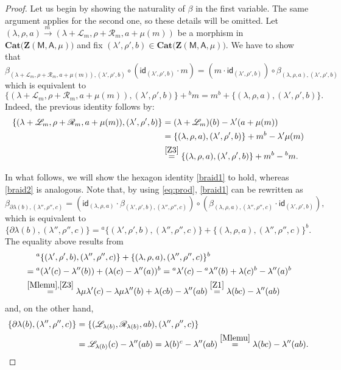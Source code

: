 \documentclass[12pt,reqno]{amsart}
\theoremstyle{plain}
\theoremstyle{definition}
\theoremstyle{remark}
\newcommand{\A}{\ensuremath{\mathsf{A}}}
\newcommand{\id}{\ensuremath{\mathsf{id}}}
\newcommand{\MM}{\ensuremath{\mathsf{M}}}
\newcommand{\ZC}{\ensuremath{\mathbf{Z}}}
\newcommand{\Cat}{\ensuremath{\mathbf{Cat}}}
\newcommand{\LL}{\ensuremath{\mathcal{L}}}
\newcommand{\RR}{\ensuremath{\mathcal{R}}}
\numberwithin{equation}{section}
\begin{document}
\begin{proof}
	Let us begin by showing the naturality of $\beta$ in the first variable. The same argument applies for the second one, so these details will be omitted.
	 Let $(\lambda,\rho,a)\xrightarrow{m\,}(\lambda+\LL_{m},\rho+\RR_{m},a+\mu(m))$ be a morphism in $\Cat\big(\ZC(\MM,\A,\mu)\big)$ and fix
	  $(\lambda',\rho',b)\in \Cat\big(\ZC(\MM,\A,\mu)\big)$. We have to show that 
	\[\beta_{(\lambda+\LL_{m},\rho+\RR_{m},a+\mu(m)),(\lambda',\rho',b)}\circ (\id_{(\lambda',\rho',b)}\cdot m)=(m\cdot  \id_{(\lambda',\rho',b)})\circ \beta_{(\lambda,\rho,a),(\lambda',\rho',b)}\]
	which is equivalent to 
	\[\{(\lambda+\LL_{m},\rho+\RR_{m},a+\mu(m)),(\lambda',\rho',b)\}+{}^{b}m=m^{b}+\{(\lambda,\rho,a),(\lambda',\rho',b)\}.\]
	Indeed, the previous identity follows by:
	\begin{align*}
		\{(\lambda+\LL_{m},\rho+\RR_{m},a+\mu(m)),(\lambda',\rho',b)\}&=(\lambda+\LL_{m})(b)-\lambda'(a+\mu(m))\\
		&=\{(\lambda,\rho,a),(\lambda',\rho',b)\}+m^{b}-\lambda'\mu(m)\\
		&\stackrel{\eqref{Z3}}{=}\{(\lambda,\rho,a),(\lambda',\rho',b)\}+m^{b}-{}^{b}m.
	\end{align*}
	
	In what follows, we will show the hexagon identity \eqref{braid1} to hold, whereas \eqref{braid2} is analogous. Note that, by using \eqref{eq:prod}, \eqref{braid1} can be rewritten as
	\[\beta_{\partial\lambda(b),(\lambda'',\rho'',c)}=(\id_{(\lambda,\rho,a)}\cdot \beta_{(\lambda',\rho',b),(\lambda'',\rho'',c)})\circ (\beta_{(\lambda,\rho,a),(\lambda'',\rho'',c)}\cdot \id_{(\lambda',\rho',b)}),\]
	which is equivalent to
	\[\{\partial\lambda(b),(\lambda'',\rho'',c)\}={}^{a}\{(\lambda',\rho',b),(\lambda'',\rho'',c)\}+\{(\lambda,\rho,a),(\lambda'',\rho'',c)\}^{b}.\]
	The equality above results from
	\begin{align*}
	& \quad \	{}^{a}\{(\lambda',\rho',b),(\lambda'',\rho'',c)\}+\{(\lambda,\rho,a),(\lambda'',\rho'',c)\}^{b}\\
		&={}^{a}(\lambda'(c)-\lambda''(b))+(\lambda(c)-\lambda''(a))^{b}={}^{a}\lambda'(c)-{}^{a}\lambda''(b)+\lambda(c)^{b}-\lambda''(a)^{b}\\
		&\stackrel{\eqref{Mlemu},\eqref{Z3}}{=}\lambda\mu\lambda'(c)-\lambda\mu\lambda''(b)+\lambda(cb)-\lambda''(ab)\stackrel{\eqref{Z1}}{=}\lambda(bc)-\lambda''(ab)
	\end{align*}
	and, on the other hand, 
	\begin{align*}
		\{\partial\lambda(b),(\lambda'',\rho'',c)\}&=\{(\LL_{\lambda(b)},\RR_{\lambda(b)},ab),(\lambda'',\rho'',c)\}\\
		&=\LL_{\lambda(b)}(c)-\lambda''(ab)=\lambda(b)^{c}-\lambda''(ab)\stackrel{\eqref{Mlemu}}{=}\lambda(bc)-\lambda''(ab).\qedhere
	\end{align*}
\end{proof}
\end{document}
